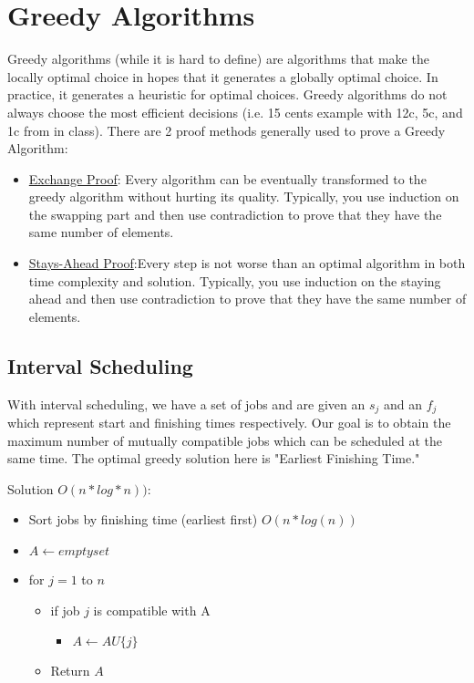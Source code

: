 \documentclass{article}
\begin{document}
\section{Greedy Algorithms}
Greedy algorithms (while it is hard to define) are algorithms that make the locally optimal choice in hopes that it generates a globally optimal choice. In practice, it generates a heuristic for optimal choices. Greedy algorithms do not always choose the most efficient decisions (i.e. 15 cents example with 12c, 5c, and 1c from in class). There are 2 proof methods generally used to prove a Greedy Algorithm:

\begin{itemize}
    \item \underline{Exchange Proof}: Every algorithm can be eventually transformed to the greedy
      algorithm without hurting its quality. Typically, you use induction on the swapping part and then use contradiction to prove that they have the same number of elements.
    \item \underline{Stays-Ahead Proof}:Every step is not worse than an optimal algorithm in both time complexity and solution.
      Typically, you use induction on the staying ahead and then use contradiction to prove that they have the same number of elements.
\end{itemize}

\subsection{Interval Scheduling}
With interval scheduling, we have a set of jobs and are given an $s_j$ and an $f_j$ which represent start and finishing times respectively. Our goal is to obtain the maximum number of mutually compatible jobs which can be scheduled at the same time. The optimal greedy solution here is "Earliest Finishing Time." 

Solution $O(n*log*n))$:
\begin{itemize}
    \item Sort jobs by finishing time (earliest first) $O(n*log(n))$
    \item $A \gets empty set$
    \item for $j = 1$ to $n$ \begin{itemize}
        \item if job $j$ is compatible with A \begin{itemize}
            \item $A \gets A U \{j\}$
        \end{itemize}
    \item Return $A$
    \end{itemize}
\end{itemize}
\end{document}
